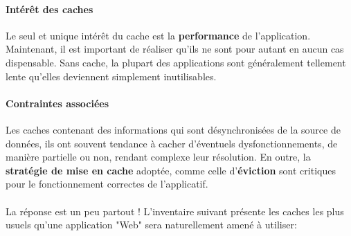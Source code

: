 {  \paragraph{Intérêt des caches} Le seul et unique intérêt du cache est la \textbf{performance} de
  l'application. Maintenant, il est important de réaliser qu'ils ne sont pour autant en aucun cas
  dispensable. Sans cache, la plupart des applications sont généralement tellement lente qu'elles
  deviennent simplement inutilisables.

  \paragraph{Contraintes associées} Les caches contenant des informations qui sont désynchronisées
  de la source de données, ils ont souvent tendance à cacher d'éventuels dysfonctionnements, de
  manière partielle ou non, rendant complexe leur résolution. En outre, la \textbf{stratégie de mise
  en cache} adoptée, comme celle d'\textbf{éviction} sont critiques pour le fonctionnement correctes
  de l'applicatif.


  \paragraph{} La réponse est un peu partout ! L'inventaire suivant présente les caches les plus
  usuels qu'une application "Web" sera naturellement amené à utiliser:

  \allcaches
}



